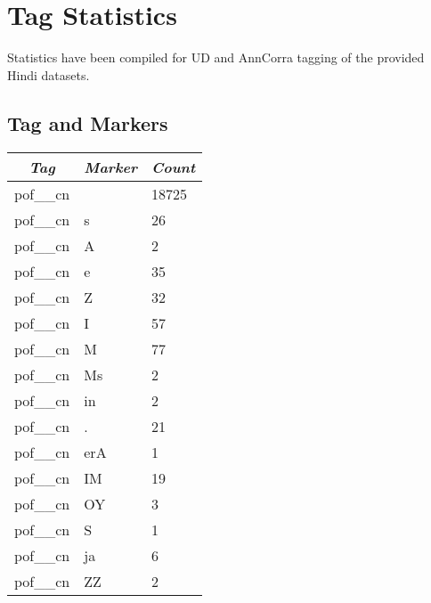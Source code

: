 \documentclass[a4 paper]{article}
\begin{document}
\section{Tag Statistics}

Statistics have been compiled for UD and AnnCorra tagging of the provided Hindi
datasets.

\subsection{Tag and Markers}


\begin{longtable}{cp{}p{}}
    \toprule
    \textit{Tag} & \textit{Marker} & \textit{Count} \\ 
    \toprule
pof\_\_cn &  & 18725\\ \midrule pof\_\_cn & s & 26\\ \midrule pof\_\_cn & A & 2\\ \midrule pof\_\_cn & e & 35\\ \midrule pof\_\_cn & Z & 32\\ \midrule pof\_\_cn & I & 57\\ \midrule pof\_\_cn & M & 77\\ \midrule pof\_\_cn & Ms & 2\\ \midrule pof\_\_cn & in & 2\\ \midrule pof\_\_cn & . & 21\\ \midrule pof\_\_cn & erA & 1\\ \midrule pof\_\_cn & IM & 19\\ \midrule pof\_\_cn & OY & 3\\ \midrule pof\_\_cn & S & 1\\ \midrule pof\_\_cn & ja & 6\\ \midrule pof\_\_cn & ZZ & 2\
\end{longtable}
\end{document}
